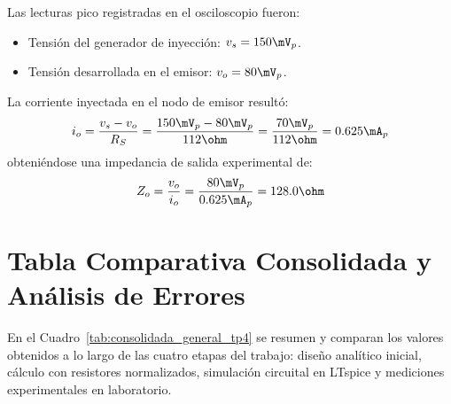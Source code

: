Las lecturas pico registradas en el osciloscopio fueron:
\begin{itemize}
  \item Tensión del generador de inyección: $v_s = 150\mV_p$.
  \item Tensión desarrollada en el emisor: $v_o = 80\mV_p$.
\end{itemize}

La corriente inyectada en el nodo de emisor resultó:
\begin{equation}
  i_o = \frac{v_s - v_o}{R_S} = \frac{150\mV_p - 80\mV_p}{112\ohm} = \frac{70\mV_p}{112\ohm} = 0.625\mA_p
\end{equation}
obteniéndose una impedancia de salida experimental de:
\begin{equation}
  Z_o = \frac{v_o}{i_o} = \frac{80\mV_p}{0.625\mA_p} = 128.0\ohm
  \label{eq:Zo_exp_val}
\end{equation}

\section{Tabla Comparativa Consolidada y Análisis de Errores}

En el Cuadro~\ref{tab:consolidada_general_tp4} se resumen y comparan los valores obtenidos a lo largo de las cuatro
etapas del trabajo: diseño analítico inicial, cálculo con resistores normalizados, simulación circuital en LTspice
y mediciones experimentales en laboratorio.


